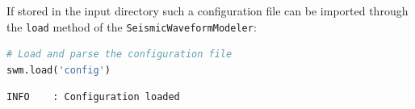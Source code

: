 \documentclass[a4paper,fleqn]{cas-sc}
\begin{document}

If stored in the input directory such a configuration file can be imported through the \texttt{load} method of the \texttt{SeismicWaveformModeler}:
\begin{lstlisting}[language=Python, firstnumber=6]
# Load and parse the configuration file
swm.load('config')
\end{lstlisting}
\begin{footnotesize}
\begin{verbatim}
INFO    : Configuration loaded
\end{verbatim}
\end{footnotesize}
\end{document}
